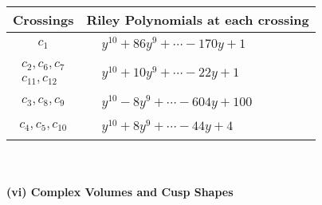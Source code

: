 \documentclass[1p]{elsarticle_modified}
\theoremstyle{definition}
\begin{document}
\begin{tabular}{m{50pt}|m{274pt}}
Crossings & \hspace{64pt}Riley Polynomials at each crossing \\
\hline $$\begin{aligned}c_{1}\end{aligned}$$&$\begin{aligned}
&y^{10}+86 y^9+\cdots-170 y+1
\end{aligned}$\\
\hline $$\begin{aligned}c_{2},c_{6},c_{7}\\c_{11},c_{12}\end{aligned}$$&$\begin{aligned}
&y^{10}+10 y^9+\cdots-22 y+1
\end{aligned}$\\
\hline $$\begin{aligned}c_{3},c_{8},c_{9}\end{aligned}$$&$\begin{aligned}
&y^{10}-8 y^9+\cdots-604 y+100
\end{aligned}$\\
\hline $$\begin{aligned}c_{4},c_{5},c_{10}\end{aligned}$$&$\begin{aligned}
&y^{10}+8 y^9+\cdots-44 y+4
\end{aligned}$\\
\hline
\end{tabular}\\~\\
\newpage\flushleft \textbf{(vi) Complex Volumes and Cusp Shapes}
\end{document}
